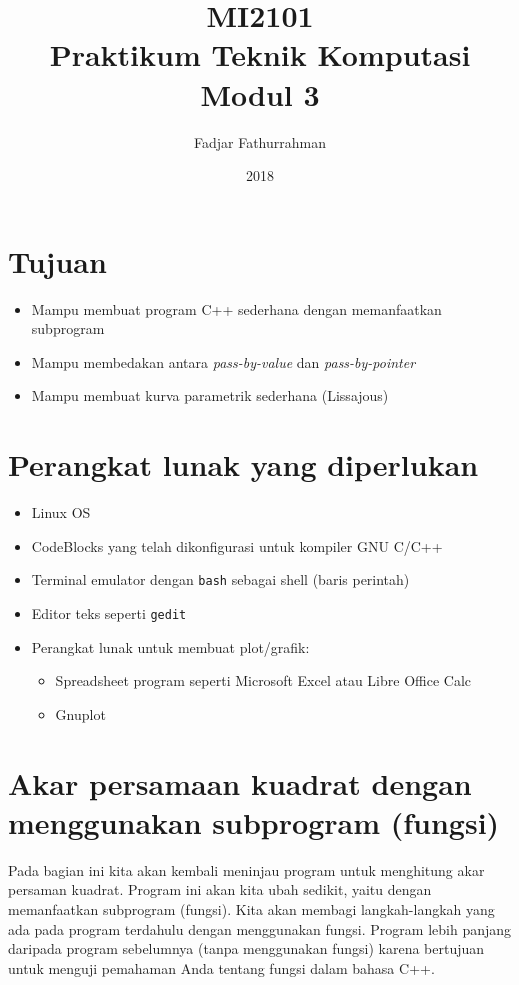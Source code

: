 \documentclass[a4paper,11pt]{extarticle}
\title{
MI2101\\
Praktikum Teknik Komputasi\\
Modul 3}
\author{Fadjar Fathurrahman}
\date{2018}
\begin{document}
\maketitle

\section{Tujuan}
\begin{itemize}
\item Mampu membuat program C++ sederhana dengan memanfaatkan subprogram
\item Mampu membedakan antara \textit{pass-by-value} dan \textit{pass-by-pointer}
\item Mampu membuat kurva parametrik sederhana (Lissajous)
\end{itemize}

\section{Perangkat lunak yang diperlukan}
\begin{itemize}
\item Linux OS
\item CodeBlocks yang telah dikonfigurasi untuk kompiler GNU C/C++
\item Terminal emulator dengan \texttt{bash} sebagai shell (baris perintah)
\item Editor teks seperti \texttt{gedit}
\item Perangkat lunak untuk membuat plot/grafik:
\begin{itemize}
\item Spreadsheet program seperti \textsf{Microsoft Excel} atau \textsf{Libre Office Calc}
\item \textsf{Gnuplot}
\end{itemize}
\end{itemize}

\section{Akar persamaan kuadrat dengan menggunakan subprogram (fungsi)}
Pada bagian ini kita akan kembali meninjau program untuk menghitung akar
persaman kuadrat. Program ini akan kita ubah sedikit, yaitu dengan memanfaatkan
subprogram (fungsi). Kita akan membagi langkah-langkah yang ada pada
program terdahulu dengan menggunakan fungsi.
Program lebih panjang daripada program sebelumnya (tanpa menggunakan fungsi)
karena bertujuan untuk menguji pemahaman Anda tentang fungsi dalam bahasa C++.
\end{document}

